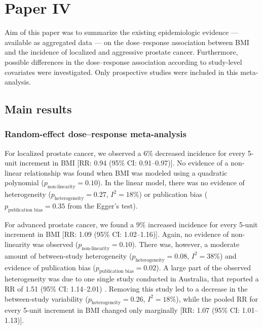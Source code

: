 %

\section{Paper IV}

Aim of this paper was to summarize the existing epidemiologic evidence --- available as aggregated data --- on the dose--response association between BMI and the incidence of localized and aggressive prostate cancer. Furthermore, possible differences in the dose--response association according to study-level covariates were investigated. Only prospective studies were included in this meta-analysis.

\subsection{Main results}

\subsubsection{Random-effect dose--response meta-analysis}

For localized prostate cancer, we observed a 6\% decreased incidence for every 5-unit increment in BMI [RR: 0.94 (95\% CI: 0.91--0.97)]. No evidence of a non-linear relationship was found when BMI was modeled using a quadratic polynomial ($p_{\textrm{non-linearity}}=0.10$). In the linear model, there was no evidence of heterogeneity ($p_{\textrm{heterogeneity}}=0.27$, $I^2=18\%$) or publication bias ($p_{\textrm{publication bias}}=0.35$ from the Egger's test).

For advanced prostate cancer, we found a 9\% increased incidence for every 5-unit increment in BMI [RR: 1.09 (95\% CI: 1.02--1.16)]. Again, no evidence of non-linearity was observed ($p_{\textrm{non-linearity}}=0.10$). There was, however, a moderate amount of between-study heterogeneity ($p_{\textrm{heterogeneity}}=0.08$, $I^2=38\%$) and evidence of publication bias ($p_{\textrm{publication bias}}=0.02$). A large part of the observed heterogeneity was due to one single study conducted in Australia, that reported a RR of 1.51 (95\% CI: 1.14--2.01) \citep{macinnis_body_2003}. Removing this study led to a decrease in the between-study variability ($p_{\textrm{heterogeneity}}=0.26$, $I^2=18\%$), while the pooled RR for every 5-unit increment in BMI changed only marginally [RR: 1.07 (95\% CI: 1.01--1.13)]. 

